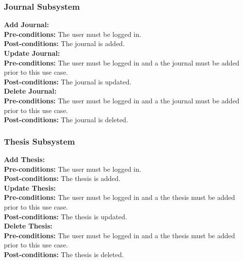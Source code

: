 \documentclass{article}
\begin{document}
			\subsubsection{Journal Subsystem}
				\textbf{Add Journal:}\\
					\indent \textbf{Pre-conditions:} The user must be logged in.\\
					\indent \textbf{Post-conditions:} The journal is added.\\
				\textbf{Update Journal:}\\
					\indent \textbf{Pre-conditions:} The user must be logged in and a the journal must be added prior to this use case.\\
					\indent \textbf{Post-conditions:} The journal is updated.\\
				\textbf{Delete Journal:}\\
					\indent \textbf{Pre-conditions:} The user must be logged in and a the journal must be added prior to this use case.\\
					\indent \textbf{Post-conditions:} The journal is deleted.\\
			\subsubsection{Thesis Subsystem}
				\textbf{Add Thesis:}\\
					\indent \textbf{Pre-conditions:} The user must be logged in.\\
					\indent \textbf{Post-conditions:} The thesis is added.\\
				\textbf{Update Thesis:}\\
					\indent \textbf{Pre-conditions:} The user must be logged in and a the thesis must be added prior to this use case.\\
					\indent \textbf{Post-conditions:} The thesis is updated.\\
				\textbf{Delete Thesis:}\\
					\indent \textbf{Pre-conditions:} The user must be logged in and a the thesis must be added prior to this use case.\\
					\indent \textbf{Post-conditions:} The thesis is deleted.\\
					
\end{document}
